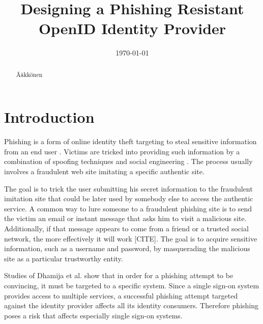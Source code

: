 \documentclass{tktltiki}
\begin{document}
\title{Designing a Phishing Resistant OpenID Identity Provider}
\author{}
\date{\today}
\maketitle


\onehalfspacing

\subject{Tietojenksittelytiede}


\begin{abstract}
  Ääkkönen
\end{abstract}

\setcounter{tocdepth}{3}
\mytableofcontents


\section{Introduction}       
  Phishing is a form of online identity theft targeting to steal sensitive information from an end user 
  \cite{phishing_attacks_and_solutions_2007, why_phishing_works_06, suspectibility_to_phishing_2006}
  . Victims are tricked into providing such information by a combination of spoofing techniques and social engineering \cite{visual_similarity_phishing_2008}
  . The process usually involves a fraudulent web site imitating a specific authentic site. 

  The goal is to trick the user submitting his secret information to the fraudulent imitation site that could be later used by somebody else to access the authentic service. A common way to lure someone to a fraudulent phishing site is to send the victim an email or instant message that asks him to visit a malicious site. Additionally, if that message appears to come from a friend or a trusted social network, the more effectively it will work [CITE]. The goal is to acquire sensitive information, such as a username and password, by masquerading the malicious site as a particular trustworthy entity.

        Studies of Dhamija et al. \cite{why_phishing_works_06} show that in order for a phishing attempt to be convincing, it must be targeted to a specific system. Since a single sign-on system provides access to multiple services, a successful phishing attempt targeted against the identity provider affects all its identity consumers. Therefore phishing poses a risk that affects especially single sign-on systems. 
\end{document}
